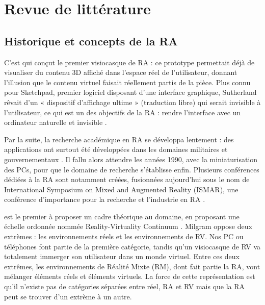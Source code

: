 \chapter{Revue de littérature}
\label{ch:litterature}

\section{Historique et concepts de la RA}
C'est \cite{Sutherland1968} qui conçut le premier visiocasque de RA  : ce prototype permettait déjà de visualiser du contenu 3D affiché dans l'espace réel de l'utilisateur, donnant l'illusion que le contenu virtuel faisait réellement partis de la pièce. Plus connu pour Sketchpad, premier logiciel disposant d'une interface graphique, Sutherland rêvait d'un « dispositif d'affichage ultime » (traduction libre) qui serait invisible à l'utilisateur, ce qui est un des objectifs de la RA : rendre l'interface avec un ordinateur naturelle et invisible \citep{Billinghurst2015}.


Par la suite, la recherche académique en RA se développa lentement : des applications ont surtout été développées dans les domaines militaires et gouvernementaux \citep{VanKrevelen2010}. Il fallu alors attendre les années 1990, avec la miniaturisation des PCs, pour que le domaine de recherche s'établisse enfin. Plusieurs conférences dédiées à la RA sont notamment créées, fusionnées aujourd'hui sous le nom de International Symposium on Mixed and Augmented Reality (ISMAR), une conférence d'importance pour la recherche et l'industrie en RA \citep{Azuma2001}.

\cite{Milgram1994} est le premier à proposer un cadre théorique au domaine, en proposant une échelle ordonnée nommée \foreignlanguage{english}{Reality-Virtuality Continuum} . Milgram oppose deux extrèmes : les environnements réels et les environnements de RV. Nos PC ou téléphones font partie de la première catégorie, tandis qu'un visiocasque de RV va totalement immerger son utilisateur dans un monde virtuel. Entre ces deux extrêmes, les environnements de Réalité Mixte (RM), dont fait partie la RA, vont mélanger éléments réels et éléments virtuels. La force de cette représentation est qu'il n'existe pas de catégories séparées entre réel, RA et RV mais que la RA peut se trouver d'un extrème à un autre.

